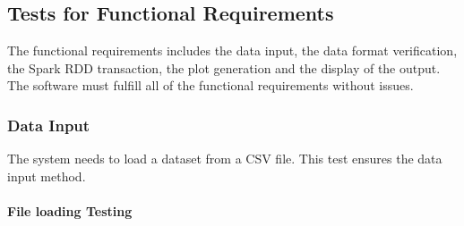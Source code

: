 \documentclass[12pt, titlepage]{article}
\begin{document}
\subsection{Tests for Functional Requirements}
The functional requirements includes the data input, the data format verification, the Spark RDD transaction, the plot generation and the display of the output. The software must fulfill all of the functional requirements without issues.

\subsubsection{Data Input}
The system needs to load a dataset from a CSV file. This test ensures the data input method. 
\paragraph{File loading Testing }
\end{document}
